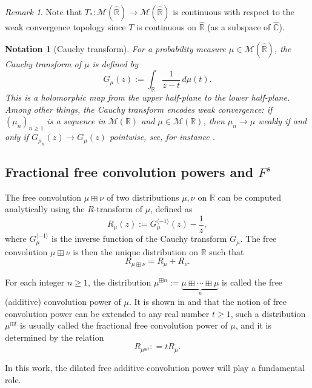 \documentclass[reqno,11pt]{amsart}
\newtheorem{notation}[theorem]{Notation}
\theoremstyle{remark}
\newtheorem{remark}[theorem]{Remark}
\newcommand{\cc}{\mathbb{C}}
\newcommand{\rr}{\mathbb{R}}
\newcommand{\MM}{\mathcal{M}}
\newcommand{\freepower}[1]{F^{#1}}
\begin{document}
\begin{remark}
\label{rem:Mob.cont}
    Note that $T_*:\MM(\hat{\rr})\to \MM(\hat{\rr})$ is continuous with respect to the weak convergence topology since $T$ is continuous on $ \hat{\rr} $ (as a subspace of $ \hat{\cc} $).
\end{remark}


\begin{notation}[Cauchy transform]
    For a probability measure $\mu \in \MM(\hat{\rr})$, the \emph{Cauchy transform} of $\mu$ is defined by
    \[ G_{\mu}(z) := \int_{\rr} \frac{1}{z-t} \, d\mu(t) \text{.} \]
    This is a holomorphic map from the upper half-plane to the lower half-plane. Among other things, the Cauchy transform encodes weak convergence: if $(\mu_n)_{n \geq 1}$ is a sequence in $\MM(\rr)$ and $\mu \in \MM(\rr)$, then $\mu_n \to \mu$ weakly if and only if $G_{\mu_n}(z) \to G_{\mu}(z)$ pointwise, see, for instance \cite[Remark 3.12, Theorem 3.13]{mingo2017free}.
\end{notation}




\subsection{Fractional free convolution powers and \texorpdfstring{$\freepower{s}$}{Fs} }

The free convolution $ \mu\boxplus \nu $ of two distributions $\mu,\nu$ on $\rr$ can be computed analytically using the $R$-transform of $\mu$, defined as
$$ R_\mu(z) :=G_\mu^{\langle -1\rangle}(z)-\frac{1}{z}, $$
where $ G_\mu^{\langle -1\rangle} $ is the inverse function of the Cauchy transform $G_\mu$. The free convolution $\mu\boxplus \nu$ is then the unique distribution on $\rr$ such that
$$ R_{ \mu\boxplus \nu }=R_\mu + R_\nu. $$

For each integer $n\geq 1$,  the distribution $ \mu^{\boxplus n}:= \underbrace{\mu\boxplus \cdots \boxplus \mu}_{n} $ is called the free (additive) convolution power of $ \mu$. It is shown in \cite{nica1996multiplicative} and \cite{bercovici1995superconvergence} that the notion of free convolution power can be extended to any real number $ 
t\geq 1 $, such a distribution $ \mu^{\boxplus t} $ is usually called the fractional free convolution power of $\mu$, and it is determined by the relation
$$ R_{ \mu^{\boxplus t} }: = tR_{\mu} .$$

In this work, the dilated free additive convolution power will play a fundamental role.
\end{document}
